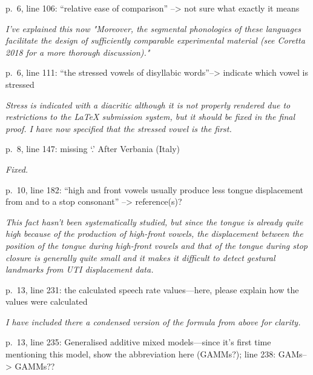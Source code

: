\documentclass[]{article}
\begin{document}
p.~6, line 106: ``relative ease of comparison'' --\textgreater{} not
sure what exactly it means

\begin{adjustwidth}{1cm}{} \textit{
I've explained this now "Moreover, the segmental phonologies of these languages facilitate the design of sufficiently comparable experimental material (see Coretta 2018 for a more thorough discussion)."
} \end{adjustwidth}

p.~6, line 111: ``the stressed vowels of disyllabic
words''--\textgreater{} indicate which vowel is stressed

\begin{adjustwidth}{1cm}{} \textit{
Stress is indicated with a diacritic although it is not properly rendered due to restrictions to the LaTeX submission system, but it should be fixed in the final proof. I have now specified that the stressed vowel is the first.
} \end{adjustwidth}

p.~8, line 147: missing `.' After Verbania (Italy)

\begin{adjustwidth}{1cm}{} \textit{
Fixed.
} \end{adjustwidth}

p.~10, line 182: ``high and front vowels usually produce less tongue
displacement from and to a stop consonant'' --\textgreater{}
reference(s)?

\begin{adjustwidth}{1cm}{} \textit{
This fact hasn't been systematically studied, but since the tongue is already quite high because of the production of high-front vowels, the displacement between the position of the tongue during high-front vowels and that of the tongue during stop closure is generally quite small and it makes it difficult to detect gestural landmarks from UTI displacement data.
} \end{adjustwidth}

p.~13, line 231: the calculated speech rate values---here, please
explain how the values were calculated

\begin{adjustwidth}{1cm}{} \textit{
I have included there a condensed version of the formula from above for clarity.
} \end{adjustwidth}

p.~13, line 235: Generalised additive mixed models---since it's first
time mentioning this model, show the abbreviation here (GAMMs?); line
238: GAMs--\textgreater{} GAMMs??
\end{document}
